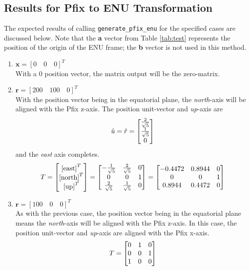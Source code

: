 \documentclass[11pt,fleqn]{report}
\begin{document}
\subsection{Results for Pfix to ENU Transformation}
The expected results of calling \texttt{generate\_pfix\_enu} for
the specified cases are discussed below. Note that the \textbf{a}
vector from Table \ref{tab:test} represents the position of the origin
of the ENU frame; the \textbf{b} vector is not used in this method.
\begin{enumerate}
 \item $\textbf{x} = [0 \quad 0 \quad 0]^T$ \\
 With a 0 position vector, the matrix output will be the zero-matrix.

 \item $\textbf{r} = [200 \quad 100 \quad 0]^T$ \\
 With the position vector being in the equatorial plane, the
 \textit{north}-axis will be aligned with the Pfix z-axis.
 The position unit-vector and \textit{up}-axis are
 \begin{equation*}
 \hat u = \hat r = \begin{bmatrix} \frac{2}{\sqrt{5}} \\
 \frac{1}{\sqrt{5}} \\
 0
 \end{bmatrix} \hfill
 \end{equation*}
 and the \textit{east} axis completes.
 \begin{equation*}
\hfill T = \begin{bmatrix}
 \text{[east]}^T \\
 \text{[north]}^T \\
 \text{[up]}^T
 \end{bmatrix}
 =
 \begin{bmatrix}
 -\frac{1}{\sqrt5} & \frac{2}{\sqrt5} & 0 \\
 0 &0 & 1 \\
\frac{2}{\sqrt5} & \frac{1}{\sqrt5} & 0
 \end{bmatrix}
 =
 \begin{bmatrix}
 -0.4472 & 0.8944 & 0 \\
 0 & 0& 1 \\
0.8944 & 0.4472 & 0
 \end{bmatrix} \hfill
 \end{equation*}

 \item $\textbf{r} = [100 \quad 0 \quad 0]^T$ \\
 As with the previous case, the position vector being in the
 equatorial plane means the
 \textit{north}-axis will be aligned with the Pfix z-axis.
 In this case,
 the position unit-vector and \textit{up}-axis are
 aligned with the Pfix x-axis.
 \begin{equation*}
\hfill T = \begin{bmatrix}
0 & 1 & 0 \\
0 & 0 & 1 \\
1 & 0 & 0
 \end{bmatrix} \hfill
 \end{equation*}


\end{enumerate}
\end{document}
